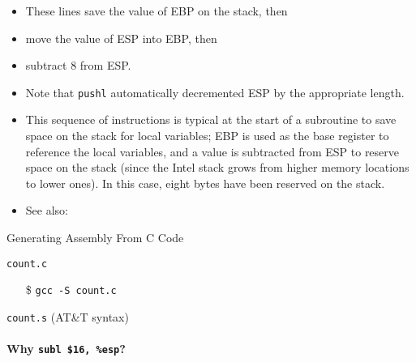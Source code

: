 \begin{itemize}
\item These lines save the value of EBP on the stack, then
\item move the value of ESP into EBP, then
\item subtract 8 from ESP.
\item Note that \texttt{pushl} automatically decremented ESP by the appropriate length.
\item This sequence of instructions is typical at the start of a subroutine to save space
  on the stack for local variables; EBP is used as the base register to reference the
  local variables, and a value is subtracted from ESP to reserve space on the stack (since
  the Intel stack grows from higher memory locations to lower ones). In this case, eight
  bytes have been reserved on the stack.
\item See also: 
\end{itemize}

\begin{frame}{Generating Assembly From C Code}
  \begin{minipage}{.32\linewidth}
      \begin{block}{\texttt{count.c}}
        \begin{center}
        \end{center}
      \end{block}
      \begin{itemize}
      \item[\$] \texttt{gcc -S count.c}
      \end{itemize}
  \end{minipage}\qquad
  \begin{minipage}{.59\linewidth}
      \begin{block}{\texttt{count.s} \scriptsize{(AT\&T syntax)}}
        \begin{center}
        \end{center}
      \end{block}    
  \end{minipage}
\end{frame}

\paragraph{Why \texttt{subl \$16, \%esp}?}

